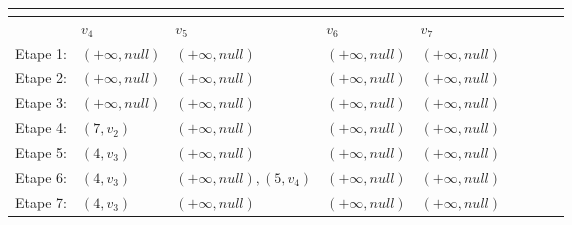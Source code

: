 \begin{exemple}
\begin{table}[]
\begin{tabular}{l|l|l|l|l|l|l|l|l|}
\multicolumn{1}{|l|}{}  		&  &    &    &      \\ \hline
\multicolumn{1}{|l|}{}         & $v_{4}$ &$v_{5}$  & $v_{6}$ &$v_{7}$  \\ \hline
\multicolumn{1}{|l|}{Etape 1:} & $(+\infty,null)$   &$(+\infty,null)$     &$(+\infty,null)$    &$(+\infty,null)$    \\ \hline
\multicolumn{1}{|l|}{Etape 2:} &$(+\infty,null)$    &$(+\infty,null)$    &$(+\infty,null)$    &$(+\infty,null)$    \\ \hline
\multicolumn{1}{|l|}{Etape 3:} &$(+\infty,null)$    &$(+\infty,null)$    &$(+\infty,null)$    &$(+\infty,null)$    \\ \hline
\multicolumn{1}{|l|}{Etape 4:} &$(7,v_{2})$    &$(+\infty,null)$    &$(+\infty,null)$    &$(+\infty,null)$    \\ \hline
\multicolumn{1}{|l|}{Etape 5:} &$(4,v_{3})$    &$(+\infty,null)$    &$(+\infty,null)$    &$(+\infty,null)$    \\ \hline
\multicolumn{1}{|l|}{Etape 6:} &$(4,v_{3})$     &$(+\infty,null),(5,v_{4})$    &$(+\infty,null)$    &$(+\infty,null)$    \\ \hline
\multicolumn{1}{|l|}{Etape 7:} &$(4,v_{3})$     &$(+\infty,null)$    &$(+\infty,null)$    &$(+\infty,null)$    \\ \hline

\end{tabular}




\end{table}
\setlength{\overfullrule}{10pt}

\end{exemple}	 

\clearpage